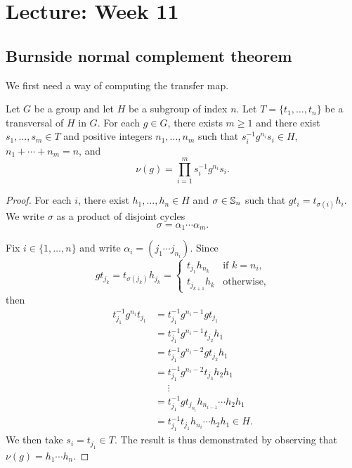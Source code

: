 \section{Lecture: Week 11}

\subsection{Burnside normal complement theorem}

We first need a way of computing the transfer map.

\begin{lemma}
	\label{lem:evaluation}
	Let $G$ be a group and let $H$ be a subgroup of index $n$. Let $T=\{t_1,\dots,t_n\}$ be a transversal of $H$ in $G$. For each $g \in G$, there exists $m\geq1$ and there exist $s_{1},\dots,s_{m} \in T$ and positive integers $n_1,\dots,n_m$ such that $s_i^{-1}g^{n_i}s_i \in H$, $n_1+\cdots+n_m=n$, and 
	\[
		\nu(g)=\prod_{i=1}^m s_i^{-1}g^{n_i}s_i.
	\]
\end{lemma}

\begin{proof}
	For each $i$, there exist $h_1,\dots,h_n\in H$ and $\sigma\in\mathbb{S}_n$ such that $gt_i=t_{\sigma(i)}h_i$. We write $\sigma$ as a product of disjoint cycles
	\[
		\sigma=\alpha_1\cdots\alpha_m.
	\]

	Fix $i\in\{1,\dots,n\}$ and write    
	$\alpha_i=(j_{1}\cdots j_{n_i})$. Since  
	\[
		g t_{j_k}=t_{\sigma(j_k)}h_{j_k}=\begin{cases}
			t_{j_1}h_{n_k} & \text{if $k=n_i$},\\
			t_{j_{k+1}}h_{k} & \text{otherwise},
		\end{cases}
	\]
	then 
	\begin{align*}
	t_{j_1}^{-1}g^{n_i}t_{j_1}
	&=t_{j_1}^{-1}g^{n_i-1}gt_{j_1}\\
	&=t_{j_1}^{-1}g^{n_i-1}t_{j_2}h_1\\
	&=t_{j_1}^{-1}g^{n_i-2}gt_{j_2}h_1\\
	&=t_{j_1}^{-1}g^{n_i-2}t_{j_3}h_2h_1\\
	&\phantom{=}\vdots\\
	&=t_{j_1}^{-1}gt_{j_{n_i}}h_{n_{i-1}}\cdots h_2h_1\\
	&=t_{j_1}^{-1}t_{j_1}h_{n_i}\cdots h_2h_1\in H. 	
	\end{align*}
	We then take $s_i=t_{j_1}\in T$. The result is thus demonstrated by observing that $\nu(g)=h_1\cdots h_n$. 
\end{proof}



